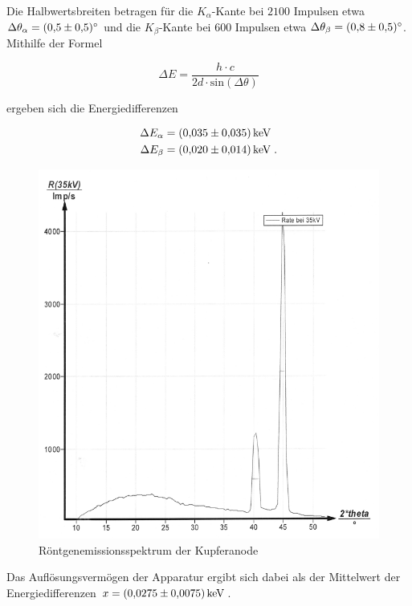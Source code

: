 Die Halbwertsbreiten betragen für die $K_\alpha$-Kante bei $2100$ Impulsen
etwa $\Delta \theta_\alpha = \SI{0.5 +- 0.5}{\degree}$ und die $K_\beta$-Kante bei $600$ Impulsen
etwa $\Delta \theta_\beta = \SI{0.8 +- 0.5}{\degree}$.
Mithilfe der Formel

\begin{equation}
  \Delta E = \frac{h \cdot c}{2d \cdot \text{sin}\left(\Delta \theta \right)}
\end{equation}

ergeben sich die Energiedifferenzen 

\begin{align*}
  \Delta E_\alpha &= \SI{0.035 +- 0.035}{\kilo\eV} \\
  \Delta E_\beta &= \SI{0.020 +- 0.014}{\kilo\eV}  \; .
\end{align*}

\begin{figure}[H]
  \centering
  \includegraphics[scale=0.3]{content/bild2.png}
  \caption{Röntgenemissionsspektrum der Kupferanode}
  \label{fig:plot2}
\end{figure}

Das Auflösungsvermögen der Apparatur ergibt sich dabei als der Mittelwert der 
Energiedifferenzen $ x = \SI{0.0275 +- 0.0075}{\kilo\eV}$.


